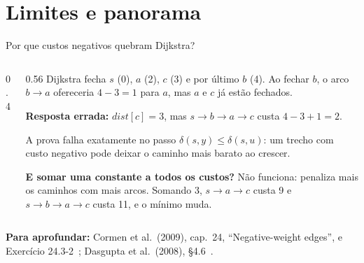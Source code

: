\documentclass[aspectratio=169,xcolor=table]{beamer}
\newcommand{\fonte}[1]{%
  \vfill
  {\tiny\color{gray!55!black}\textbf{Para aprofundar:} #1\par}%
}
\begin{document}
\section{Limites e panorama}

\begin{frame}{Por que custos negativos quebram Dijkstra?}
  \begin{columns}[c]
    \begin{column}{0.4\textwidth}
      \begin{center}
      \end{center}
    \end{column}
    \begin{column}{0.56\textwidth}
      \scriptsize
      Dijkstra fecha $s$ (0), $a$ (2), $c$ (3) e por último $b$ (4). Ao fechar $b$, o arco
      $b \to a$ ofereceria $4 - 3 = 1$ para $a$, mas $a$ e $c$ já estão fechados.
      \medskip

      \textbf{Resposta errada:} $\mathit{dist}[c] = 3$, mas
      $s \to b \to a \to c$ custa $4 - 3 + 1 = 2$.
      \medskip

      A prova falha exatamente no passo $\delta(s,y) \le \delta(s,u)$: um trecho com custo
      negativo pode deixar o caminho mais barato ao crescer.
      \medskip

      \textbf{E somar uma constante a todos os custos?} Não funciona: penaliza mais os
      caminhos com mais arcos. Somando 3, $s \to a \to c$ custa 9 e $s \to b \to a \to c$
      custa 11, e o mínimo muda.
    \end{column}
  \end{columns}
  \fonte{Cormen et al.\ (2009), cap.~24, ``Negative-weight edges'', e Exercício
    24.3-2~\cite{cormen2009introduction}; Dasgupta et al.\ (2008),
    \S 4.6~\cite{dasgupta2008algorithms}.}
\end{frame}
\end{document}
